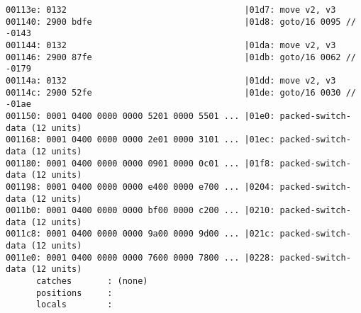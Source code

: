 \begin{lstlisting}
00113e: 0132                                   |01d7: move v2, v3
001140: 2900 bdfe                              |01d8: goto/16 0095 // -0143
001144: 0132                                   |01da: move v2, v3
001146: 2900 87fe                              |01db: goto/16 0062 // -0179
00114a: 0132                                   |01dd: move v2, v3
00114c: 2900 52fe                              |01de: goto/16 0030 // -01ae
001150: 0001 0400 0000 0000 5201 0000 5501 ... |01e0: packed-switch-data (12 units)
001168: 0001 0400 0000 0000 2e01 0000 3101 ... |01ec: packed-switch-data (12 units)
001180: 0001 0400 0000 0000 0901 0000 0c01 ... |01f8: packed-switch-data (12 units)
001198: 0001 0400 0000 0000 e400 0000 e700 ... |0204: packed-switch-data (12 units)
0011b0: 0001 0400 0000 0000 bf00 0000 c200 ... |0210: packed-switch-data (12 units)
0011c8: 0001 0400 0000 0000 9a00 0000 9d00 ... |021c: packed-switch-data (12 units)
0011e0: 0001 0400 0000 0000 7600 0000 7800 ... |0228: packed-switch-data (12 units)
      catches       : (none)
      positions     :
      locals        :


\end{lstlisting}
